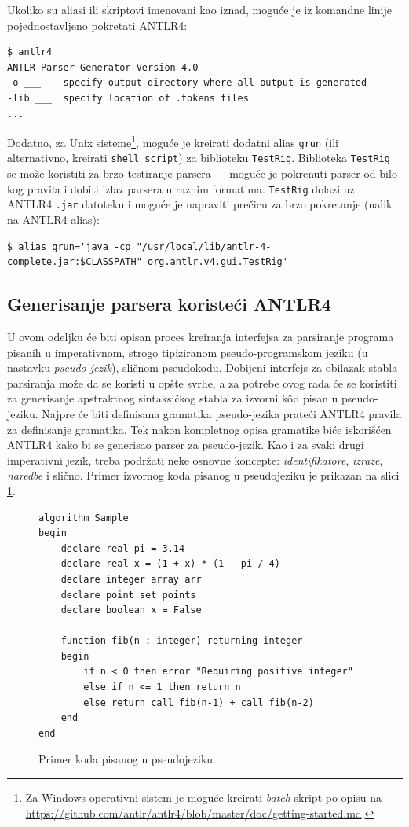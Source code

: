 Ukoliko su aliasi ili skriptovi imenovani kao iznad, moguće je iz komandne linije pojednostavljeno pokretati ANTLR4:  
\begin{lstlisting}[language={}]
$ antlr4
ANTLR Parser Generator Version 4.0
-o ___    specify output directory where all output is generated
-lib ___  specify location of .tokens files
...
\end{lstlisting}

Dodatno, za Unix sisteme\footnote{Za Windows operativni sistem je moguće kreirati \emph{batch} skript po opisu na \url{https://github.com/antlr/antlr4/blob/master/doc/getting-started.md}.}, moguće je kreirati dodatni alias \texttt{grun} (ili alternativno, kreirati \texttt{shell script}) za biblioteku \texttt{TestRig}. Biblioteka \texttt{TestRig} se može koristiti za brzo testiranje parsera --- moguće je pokrenuti parser od bilo kog pravila i dobiti izlaz parsera u raznim formatima. \texttt{TestRig} dolazi uz ANTLR4 \texttt{.jar} datoteku i moguće je napraviti prečicu za brzo pokretanje (nalik na ANTLR4 alias):
\begin{lstlisting}[language={}]
$ alias grun='java -cp "/usr/local/lib/antlr-4-complete.jar:$CLASSPATH" org.antlr.v4.gui.TestRig'
\end{lstlisting}


\subsection{Generisanje parsera koristeći ANTLR4}
\label{subsec:ANTLRParserGeneration}

U ovom odeljku će biti opisan proces kreiranja interfejsa za parsiranje programa pisanih u imperativnom, strogo tipiziranom pseudo-programskom jeziku (u nastavku \emph{pseudo-jezik}), sličnom pseudokodu. Dobijeni interfejs za obilazak stabla parsiranja može da se koristi u opšte svrhe, a za potrebe ovog rada će se koristiti za generisanje apstraktnog sintaksičkog stabla za izvorni k\^od pisan u pseudo-jeziku. Najpre će biti definisana gramatika pseudo-jezika prateći ANTLR4 pravila za definisanje gramatika. Tek nakon kompletnog opisa gramatike biće iskorišćen ANTLR4 kako bi se generisao parser za pseudo-jezik. Kao i za svaki drugi imperativni jezik, treba podržati neke osnovne koncepte: \emph{identifikatore}, \emph{izraze}, \emph{naredbe} i slično. Primer izvornog koda pisanog u pseudojeziku je prikazan na slici \ref{fig:PseudoCodeExample}.

\begin{figure}[h!]
\begin{lstlisting}
algorithm Sample
begin
	declare real pi = 3.14
	declare real x = (1 + x) * (1 - pi / 4)
	declare integer array arr
	declare point set points
	declare boolean x = False
	
	function fib(n : integer) returning integer
	begin
		if n < 0 then error "Requiring positive integer"
		else if n <= 1 then return n
		else return call fib(n-1) + call fib(n-2)
	end
end
\end{lstlisting}
\caption{Primer koda pisanog u pseudojeziku.}
\label{fig:PseudoCodeExample}
\end{figure}


